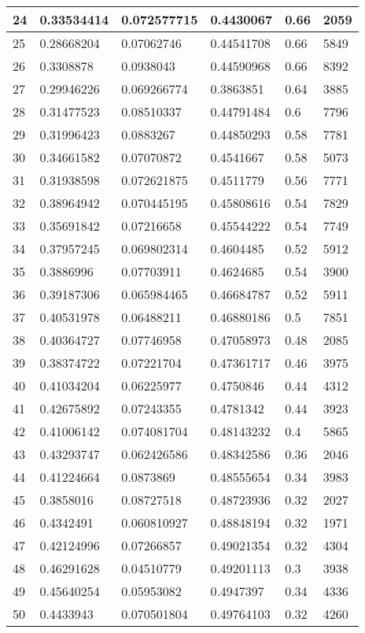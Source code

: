 \begin{longtable}{|l|l|l|l|l|l|}
24 & 0.33534414 & 0.072577715 & 0.4430067 & 0.66 & 2059 \\ \hline 
25 & 0.28668204 & 0.07062746 & 0.44541708 & 0.66 & 5849 \\ \hline 
26 & 0.3308878 & 0.0938043 & 0.44590968 & 0.66 & 8392 \\ \hline 
27 & 0.29946226 & 0.069266774 & 0.3863851 & 0.64 & 3885 \\ \hline 
28 & 0.31477523 & 0.08510337 & 0.44791484 & 0.6 & 7796 \\ \hline 
29 & 0.31996423 & 0.0883267 & 0.44850293 & 0.58 & 7781 \\ \hline 
30 & 0.34661582 & 0.07070872 & 0.4541667 & 0.58 & 5073 \\ \hline 
31 & 0.31938598 & 0.072621875 & 0.4511779 & 0.56 & 7771 \\ \hline 
32 & 0.38964942 & 0.070445195 & 0.45808616 & 0.54 & 7829 \\ \hline 
33 & 0.35691842 & 0.07216658 & 0.45544222 & 0.54 & 7749 \\ \hline 
34 & 0.37957245 & 0.069802314 & 0.4604485 & 0.52 & 5912 \\ \hline 
35 & 0.3886996 & 0.07703911 & 0.4624685 & 0.54 & 3900 \\ \hline 
36 & 0.39187306 & 0.065984465 & 0.46684787 & 0.52 & 5911 \\ \hline 
37 & 0.40531978 & 0.06488211 & 0.46880186 & 0.5 & 7851 \\ \hline 
38 & 0.40364727 & 0.07746958 & 0.47058973 & 0.48 & 2085 \\ \hline 
39 & 0.38374722 & 0.07221704 & 0.47361717 & 0.46 & 3975 \\ \hline 
40 & 0.41034204 & 0.06225977 & 0.4750846 & 0.44 & 4312 \\ \hline 
41 & 0.42675892 & 0.07243355 & 0.4781342 & 0.44 & 3923 \\ \hline 
42 & 0.41006142 & 0.074081704 & 0.48143232 & 0.4 & 5865 \\ \hline 
43 & 0.43293747 & 0.062426586 & 0.48342586 & 0.36 & 2046 \\ \hline 
44 & 0.41224664 & 0.0873869 & 0.48555654 & 0.34 & 3983 \\ \hline 
45 & 0.3858016 & 0.08727518 & 0.48723936 & 0.32 & 2027 \\ \hline 
46 & 0.4342491 & 0.060810927 & 0.48848194 & 0.32 & 1971 \\ \hline 
47 & 0.42124996 & 0.07266857 & 0.49021354 & 0.32 & 4304 \\ \hline 
48 & 0.46291628 & 0.04510779 & 0.49201113 & 0.3 & 3938 \\ \hline 
49 & 0.45640254 & 0.05953082 & 0.4947397 & 0.34 & 4336 \\ \hline 
50 & 0.4433943 & 0.070501804 & 0.49764103 & 0.32 & 4260 \\ \hline 
\end{longtable}